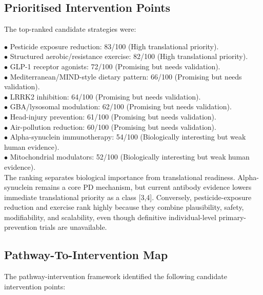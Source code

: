 \documentclass{article}
\begin{document}
\subsection{Prioritised Intervention Points}

The top-ranked candidate strategies were:


\noindent $\bullet$ Pesticide exposure reduction: 83/100 (High translational priority).\\
\noindent $\bullet$ Structured aerobic/resistance exercise: 82/100 (High translational priority).\\
\noindent $\bullet$ GLP-1 receptor agonists: 72/100 (Promising but needs validation).\\
\noindent $\bullet$ Mediterranean/MIND-style dietary pattern: 66/100 (Promising but needs validation).\\
\noindent $\bullet$ LRRK2 inhibition: 64/100 (Promising but needs validation).\\
\noindent $\bullet$ GBA/lysosomal modulation: 62/100 (Promising but needs validation).\\
\noindent $\bullet$ Head-injury prevention: 61/100 (Promising but needs validation).\\
\noindent $\bullet$ Air-pollution reduction: 60/100 (Promising but needs validation).\\
\noindent $\bullet$ Alpha-synuclein immunotherapy: 54/100 (Biologically interesting but weak human evidence).\\
\noindent $\bullet$ Mitochondrial modulators: 52/100 (Biologically interesting but weak human evidence).\\

The ranking separates biological importance from translational readiness. Alpha-synuclein remains a core PD mechanism, but current antibody evidence lowers immediate translational priority as a class [3,4]. Conversely, pesticide-exposure reduction and exercise rank highly because they combine plausibility, safety, modifiability, and scalability, even though definitive individual-level primary-prevention trials are unavailable.


\subsection{Pathway-To-Intervention Map}

The pathway-intervention framework identified the following candidate intervention points:
\end{document}

